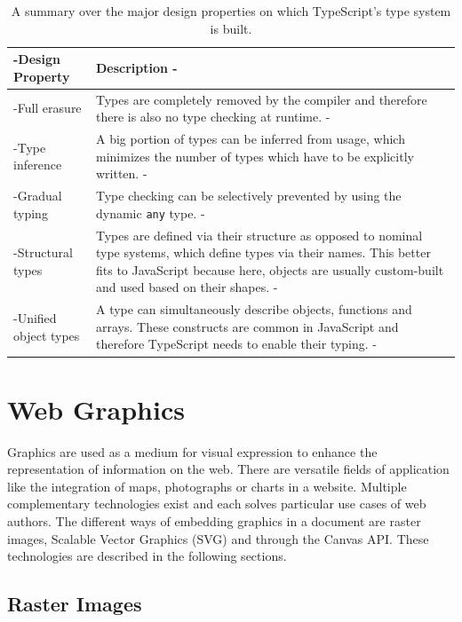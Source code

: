 \begin{table}[tp]
\tablestretch
{}
\centering
\begin{tabularx}{\linewidth}{>{\kern-\tabcolsep}lX<{\kern-\tabcolsep}}
\toprule
Design Property & Description \\
\midrule
Full erasure         & Types are completely removed by the compiler and therefore there is also no type checking at runtime. \\
Type inference       & A big portion of types can be inferred from usage, which minimizes the number of types which have to be explicitly written. \\
Gradual typing       & Type checking can be selectively prevented by using the dynamic \lstinline{any} type. \\
Structural types     & Types are defined via their structure as opposed to nominal type systems, which define types via their names. This better fits to JavaScript because here, objects are usually custom-built and used based on their shapes. \\
Unified object types & A type can simultaneously describe objects, functions and arrays. These constructs are common in JavaScript and therefore TypeScript needs to enable their typing. \\
\bottomrule
\end{tabularx}
\caption[TypeScript Type System Design Properties]{
  A summary over the major design properties on which TypeScript's type system is built.
}
\label{tab:TSTypeSystemDesignProperties}
\end{table}

\section{Web Graphics}
\label{sec:WebGraphics}

Graphics are used as a medium for visual expression to enhance the representation of information on the web. 
There are versatile fields of application like the integration of maps, photographs or charts in a website. 
Multiple complementary technologies exist and each solves particular use cases of web authors. 
The different ways of embedding graphics in a document are raster images, Scalable Vector Graphics (SVG) and through the Canvas API. 
These technologies are described in the following sections.

\subsection{Raster Images}
\label{sec:RasterImages}

